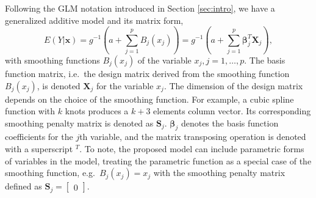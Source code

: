 \documentclass[AMA,STIX1COL,]{WileyNJD-v2}
\begin{document}
Following the GLM notation introduced in Section \ref{sec:intro}, we
have a generalized additive model and its matrix form,
\begin{equation}\label{eq:gam}
E(Y|\boldsymbol{x}) = g^{-1}(a + \sum\limits^p_{j=1}B_j(x_j)) = g^{-1}(a + \sum\limits^p_{j=1} \boldsymbol{\beta}_j^T \boldsymbol{X}_j),
\end{equation} with smoothing functions \(B_j(x_j)\) of the variable
\(x_j, j = 1, \dots, p.\) The basis function matrix, i.e.~the design
matrix derived from the smoothing function \(B_j(x_j)\), is denoted
\(\boldsymbol{X}_j\) for the variable \(x_j\). The dimension of the
design matrix depends on the choice of the smoothing function. For
example, a cubic spline function with \(k\) knots produces a \(k+3\)
elements column vector. Its corresponding smoothing penalty matrix is
denoted as \(\boldsymbol{S}_j\). \(\boldsymbol{\beta}_j\) denotes the
basis function coefficients for the \(j\)th variable, and the matrix
transposing operation is denoted with a superscript \(^T\). To note, the
proposed model can include parametric forms of variables in the model,
treating the parametric function as a special case of the smoothing
function, e.g.~\(B_j(x_j) = x_j\) with the smoothing penalty matrix
defined as \(\boldsymbol{S}_j = \begin{bmatrix}0\end{bmatrix}\).
\end{document}

